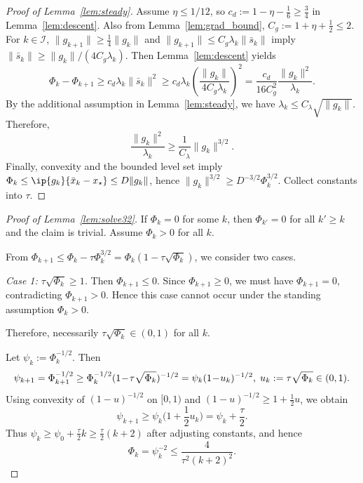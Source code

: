 \documentclass[review,onefignum,onetabnum]{siamart171218}
\begin{document}
\begin{proof}[Proof of Lemma~\ref{lem:steady}]
Assume $\eta\le 1/12$, so $c_d:=1-\eta-\frac16\ge \frac34$ in Lemma~\ref{lem:descent}.
Also from Lemma~\ref{lem:grad_bound}, $C_g:=1+\eta+\frac12\le 2$.
For $k\in\mathcal I$, $\|g_{k+1}\|\ge \frac14\|g_k\|$ and $\|g_{k+1}\|\le C_g\lambda_k\|\bar s_k\|$ imply
$\|\bar s_k\|\ge \|g_k\|/(4C_g\lambda_k)$.
Then Lemma~\ref{lem:descent} yields
\[
\Phi_k-\Phi_{k+1}\ge c_d\lambda_k\|\bar s_k\|^2
\ge c_d\lambda_k\left(\frac{\|g_k\|}{4C_g\lambda_k}\right)^2
=\frac{c_d}{16C_g^2}\frac{\|g_k\|^2}{\lambda_k}.
\]
By the additional assumption in Lemma~\ref{lem:steady}, we have $\lambda_k\le C_\lambda\sqrt{\|g_k\|}$.
Therefore,
\[
\frac{\|g_k\|^2}{\lambda_k}\ge \frac{1}{C_\lambda}\|g_k\|^{3/2}.
\]
Finally, convexity and the bounded level set imply $\Phi_k\le \ip{g_k}{\bar x_k-x_\star}\le D\|g_k\|$, hence
$\|g_k\|^{3/2}\ge D^{-3/2}\Phi_k^{3/2}$.
Collect constants into $\tau$.
\end{proof}

\begin{proof}[Proof of Lemma~\ref{lem:solve32}]
If $\Phi_k=0$ for some $k$, then $\Phi_{k'}=0$ for all $k'\ge k$ and the claim is trivial.
Assume $\Phi_k>0$ for all $k$.

From $\Phi_{k+1}\le \Phi_k-\tau \Phi_k^{3/2}=\Phi_k(1-\tau\sqrt{\Phi_k})$, we consider two cases.

\emph{Case 1: $\tau\sqrt{\Phi_k}\ge 1$.}
Then $\Phi_{k+1}\le 0$. Since $\Phi_{k+1}\ge 0$, we must have $\Phi_{k+1}=0$,
contradicting $\Phi_{k+1}>0$.
Hence this case cannot occur under the standing assumption $\Phi_k>0$.

Therefore, necessarily $\tau\sqrt{\Phi_k}\in(0,1)$ for all $k$.

Let $\psi_k:=\Phi_k^{-1/2}$. Then
\[
\psi_{k+1}=\Phi_{k+1}^{-1/2}\ge \Phi_k^{-1/2}(1\!-\!\tau\sqrt{\Phi_k})^{-1/2}\\
=\psi_k(1\!-\!u_k)^{-1/2},\; u_k:=\tau\sqrt{\Phi_k}\in(0,1).
\]
Using convexity of $(1-u)^{-1/2}$ on $[0,1)$ and $(1-u)^{-1/2}\ge 1+\frac12u$, we obtain
\[
\psi_{k+1}\ge \psi_k\Big(1+\frac12 u_k\Big)=\psi_k+\frac{\tau}{2}.
\]
Thus $\psi_k\ge \psi_0+\frac{\tau}{2}k\ge \frac{\tau}{2}(k+2)$ after adjusting constants, and hence
\[
\Phi_k=\psi_k^{-2}\le \frac{4}{\tau^2(k+2)^2}.
\]
\end{proof}
\end{document}

